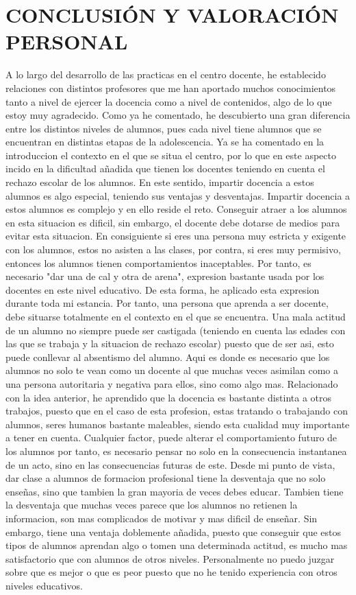 \documentclass[spanish,12pt, a4paper,twoside]{paper}
\let\oldsection\section
\def\section{\cleardoublepage\oldsection}
\begin{document}
\section{CONCLUSIÓN Y VALORACIÓN PERSONAL} %
\justify
A lo largo del desarrollo de las practicas en el centro docente, he establecido relaciones con distintos profesores que me han aportado muchos conocimientos tanto a nivel de ejercer la docencia como a nivel de contenidos, algo de lo que estoy muy agradecido. Como ya he comentado, he descubierto una gran diferencia entre los distintos niveles de alumnos, pues cada nivel tiene alumnos que se encuentran en distintas etapas de la adolescencia.
\justify
 Ya se ha comentado en la introduccion el contexto en el que se situa el centro, por lo que en este aspecto incido en la dificultad añadida que tienen los docentes teniendo en cuenta el rechazo escolar de los alumnos. En este sentido, impartir docencia a estos alumnos es algo especial, teniendo sus ventajas y desventajas. Impartir docencia a estos alumnos es complejo y en ello reside el reto. Conseguir atraer a los alumnos en esta situacion es dificil, sin embargo, el docente debe dotarse de medios para evitar esta situacion. 
\justify
En consiguiente si eres una persona muy estricta y exigente con los alumnos, estos no asisten a las clases, por contra, si eres muy permisivo, entonces los alumnos tienen comportamientos inaceptables. Por tanto, es necesario "dar una de cal y otra de arena", expresion bastante usada por los docentes en este nivel educativo. De esta forma, he aplicado esta expresion durante toda mi estancia. 
\justify
Por tanto, una persona que aprenda a ser docente, debe situarse totalmente en el contexto en el que se encuentra. Una mala actitud de un alumno no siempre puede ser castigada (teniendo en cuenta las edades con las que se trabaja y la situacion de rechazo escolar) puesto que de ser asi, esto puede conllevar al absentismo del alumno. Aqui es donde es necesario que los alumnos no solo te vean como un docente al que muchas veces asimilan como a una persona autoritaria y negativa para ellos, sino como algo mas. 
\justify
Relacionado con la idea anterior, he aprendido que la docencia es bastante distinta a otros trabajos, puesto que en el caso de esta profesion, estas tratando o trabajando con alumnos, seres humanos bastante maleables, siendo esta cualidad muy importante a tener en cuenta. Cualquier factor, puede alterar el comportamiento futuro de los alumnos por tanto, es necesario pensar no solo en la consecuencia instantanea de un acto, sino en las consecuencias futuras de este.
\justify
Desde mi punto de vista, dar clase a alumnos de formacion profesional tiene la desventaja que no solo enseñas, sino que tambien la gran mayoria de veces debes educar. Tambien tiene la desventaja que muchas veces parece que los alumnos no retienen la informacion, son mas complicados de motivar y mas dificil de enseñar. Sin embargo, tiene una ventaja doblemente añadida, puesto que conseguir que estos tipos de alumnos aprendan algo o tomen una determinada actitud, es mucho mas satisfactorio que con alumnos de otros niveles. Personalmente no puedo juzgar sobre que es mejor o que es peor puesto que no he tenido experiencia con otros niveles educativos.
\end{document}
